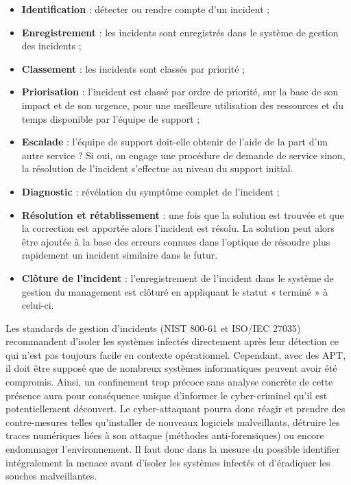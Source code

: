 \begin{itemize}
  \item \textbf{Identification} : détecter ou rendre compte d’un incident ;
  \item \textbf{Enregistrement} : les incidents sont enregistrés dans le système de gestion des incidents ;
  \item \textbf{Classement}  : les incidents sont classés par priorité ;
  \item \textbf{Priorisation} : l’incident est classé par ordre de priorité, sur la base de son impact et de son urgence, pour une meilleure utilisation des ressources et du temps disponible par l’équipe de support ;
  \item \textbf{Escalade}  : l’équipe de support doit-elle obtenir de l’aide de la part d’un autre service ? Si oui, on engage une procédure de demande de service sinon, la résolution de l'incident s’effectue au niveau du support initial.
  \item \textbf{Diagnostic}  : révélation du symptôme complet de l’incident ;
  \item \textbf{Résolution et rétablissement } : une fois que la solution est trouvée et que la correction est apportée alors l’incident est résolu. La solution peut alors être ajoutée à la base des erreurs connues dans l'optique de résoudre plus rapidement un incident similaire dans le futur.
  \item \textbf{Clôture de l’incident}  : l’enregistrement de l’incident dans le système de gestion du management est clôturé en appliquant le statut « terminé » à celui-ci.
\end{itemize}


Les standards de gestion d’incidents (NIST 800-61 et ISO/IEC 27035) recommandent d’isoler les systèmes infectés directement après leur détection ce qui n'est pas toujours facile en contexte opérationnel. Cependant,  avec des APT, il doit être supposé que de nombreux systèmes informatiques peuvent avoir été compromis.  Ainsi, un confinement trop précoce sans analyse concrète de cette présence aura pour conséquence unique d’informer le cyber-criminel qu'il est potentiellement découvert. Le cyber-attaquant pourra donc réagir et prendre des contre-mesures telles qu’installer de nouveaux logiciels malveillants, détruire les traces numériques liées à son attaque (méthodes anti-forensiques) ou encore endommager l’environnement. Il faut donc dans la mesure du possible identifier intégralement la menace avant d’isoler les systèmes infectés et d’éradiquer les souches malveillantes.

